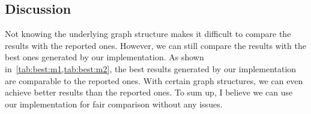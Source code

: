 \documentclass[a4paper,10pt,conference,onecolumn]{IEEEtran}
\begin{document}
\begin{multicols}{2}
\begin{minipage}{0.47\linewidth}
\begin{table}[H]
			\centering{}
			\caption{Best Comparison of \(\mathcal{M}_2\)}\label{tab:best:m2}
		\end{table}
	\end{minipage}

	\section{Discussion}
	Not knowing the underlying graph structure makes it difficult to compare the results with the reported ones. However, we can still compare the results with the best ones generated by our implementation. As shown in~\cref{tab:best:m1,tab:best:m2}, the best results generated by our implementation are comparable to the reported ones. With certain graph structures, we can even achieve better results than the reported ones. To sum up, I believe we can use our implementation for fair comparison without any issues.

	\printbibliography{}
\end{multicols}
\end{document}
